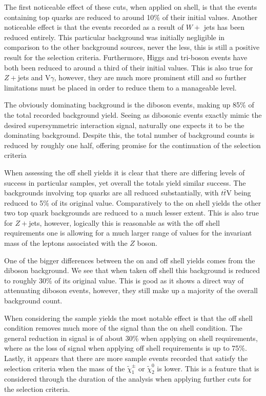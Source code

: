 The first noticeable effect of these cuts, when applied on shell, is that the events containing top quarks are reduced to around 10\% of their initial values.
Another noticeable effect is that the events recorded as a result of $W+$ jets has been reduced entirely. 
This particular background was initially negligible in comparison to the other background sources, never the less, this is still a positive result for the selection criteria.
Furthermore, Higgs and tri-boson events have both been reduced to around a third of their initial values.
This is also true for $Z+$jets and V$\gamma$, however, they are much more prominent still and so further limitations must be placed in order to reduce them to a manageable level.

The obviously dominating background is the diboson events, making up 85\% of the total recorded background yield. 
Seeing as dibosonic events exactly mimic the desired supersymmetric interaction signal, naturally one expects it to be the dominating background.
Despite this, the total number of background counts is reduced by roughly one half, offering promise for the continuation of the selection criteria

When assessing the off shell yields it is clear that there are differing levels of success in particular samples, yet overall the totals yield similar success.
The backgrounds involving top quarks are all reduced substantially, with $t\bar{t}$V being reduced to 5\% of its original value.
Comparatively to the on shell yields the other two top quark backgrounds are reduced to a much lesser extent.
This is also true for $Z+$jets, however, logically this is reasonable as with the off shell requirements one is allowing for a much larger range of values for the invariant mass of the leptons associated with the $Z$ boson.

One of the bigger differences between the on and off shell yields comes from the diboson background.
We see that when taken off shell this background is reduced to roughly 30\% of its original value.
This is good as it shows a direct way of attenuating diboson events, however, they still make up a majority of the overall background count.

When considering the sample yields the most notable effect is that the off shell condition removes much more of the signal than the on shell condition.
The general reduction in signal is of about 30\% when applying on shell requirements, where as the loss of signal when applying off shell requirements is up to 75\%.
Lastly, it appears that there are more sample events recorded that satisfy the selection criteria when the mass of the $\tilde{\chi}^{\pm}_{1}$ or $\tilde{\chi}^{0}_{2}$ is lower.
This is a feature that is considered through the duration of the analysis when applying further cuts for the selection criteria.

